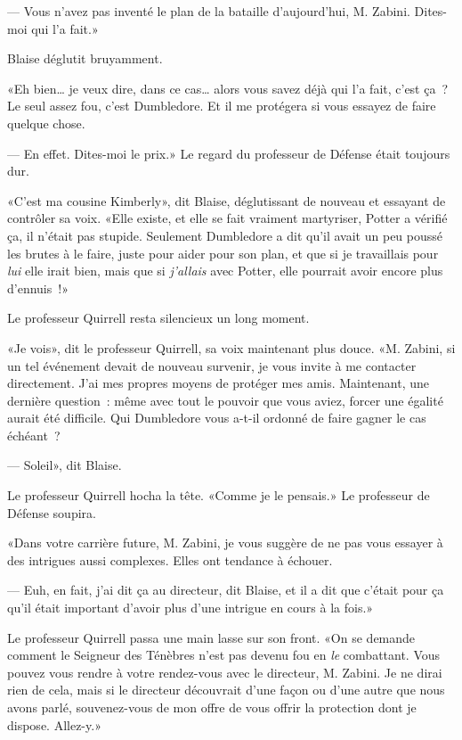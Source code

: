 --- Vous n'avez pas inventé le plan de la bataille d'aujourd'hui, M. Zabini. Dites-moi qui l'a fait.»

Blaise déglutit bruyamment.

«Eh bien… je veux dire, dans ce cas… alors vous savez déjà qui l'a fait, c'est ça~? Le seul assez fou, c'est Dumbledore. Et il me protégera si vous essayez de faire quelque chose.

--- En effet. Dites-moi le prix.» Le regard du professeur de Défense était toujours dur.

«C'est ma cousine Kimberly», dit Blaise, déglutissant de nouveau et essayant de contrôler sa voix. «Elle existe, et elle se fait vraiment martyriser, Potter a vérifié ça, il n'était pas stupide. Seulement Dumbledore a dit qu'il avait un peu poussé les brutes à le faire, juste pour aider pour son plan, et que si je travaillais pour \emph{lui} elle irait bien, mais que si \emph{j'allais} avec Potter, elle pourrait avoir encore plus d'ennuis~!»

Le professeur Quirrell resta silencieux un long moment.

«Je vois», dit le professeur Quirrell, sa voix maintenant plus douce. «M. Zabini, si un tel événement devait de nouveau survenir, je vous invite à me contacter directement. J'ai mes propres moyens de protéger mes amis. Maintenant, une dernière question~: même avec tout le pouvoir que vous aviez, forcer une égalité aurait été difficile. Qui Dumbledore vous a-t-il ordonné de faire gagner le cas échéant~?

--- Soleil», dit Blaise.

Le professeur Quirrell hocha la tête. «Comme je le pensais.» Le professeur de Défense soupira.

«Dans votre carrière future, M. Zabini, je vous suggère de ne pas vous essayer à des intrigues aussi complexes. Elles ont tendance à échouer.

--- Euh, en fait, j'ai dit ça au directeur, dit Blaise, et il a dit que c'était pour ça qu'il était important d'avoir plus d'une intrigue en cours à la fois.»

Le professeur Quirrell passa une main lasse sur son front. «On se demande comment le Seigneur des Ténèbres n'est pas devenu fou en \emph{le} combattant. Vous pouvez vous rendre à votre rendez-vous avec le directeur, M. Zabini. Je ne dirai rien de cela, mais si le directeur découvrait d'une façon ou d'une autre que nous avons parlé, souvenez-vous de mon offre de vous offrir la protection dont je dispose. Allez-y.»


